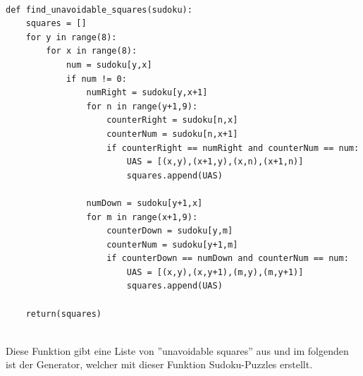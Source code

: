 \documentclass[11pt,a4paper]{article}
\begin{document}
\ \\
\begin{verbatim}   
def find_unavoidable_squares(sudoku):
    squares = []
    for y in range(8):
        for x in range(8):
            num = sudoku[y,x]
            if num != 0:
                numRight = sudoku[y,x+1]
                for n in range(y+1,9):
                    counterRight = sudoku[n,x]
                    counterNum = sudoku[n,x+1]
                    if counterRight == numRight and counterNum == num:
                        UAS = [(x,y),(x+1,y),(x,n),(x+1,n)]
                        squares.append(UAS)
            
                numDown = sudoku[y+1,x]
                for m in range(x+1,9):
                    counterDown = sudoku[y,m]
                    counterNum = sudoku[y+1,m]
                    if counterDown == numDown and counterNum == num:
                        UAS = [(x,y),(x,y+1),(m,y),(m,y+1)]
                        squares.append(UAS)
            
    return(squares)
\end{verbatim}
\ \\
Diese Funktion gibt eine Liste von ''unavoidable squares'' aus und im folgenden ist der Generator, welcher mit dieser Funktion Sudoku-Puzzles erstellt.
\ \\
\end{document}
